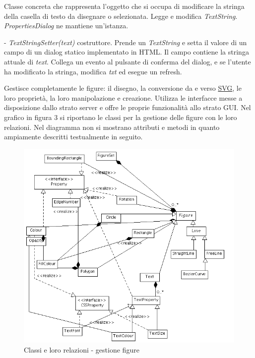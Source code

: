 Classe concreta che rappresenta l'oggetto che si occupa di modificare la stringa della casella di testo da disegnare o selezionata.
Legge e modifica \textit{TextString}.
\textit{PropertiesDialog} ne mantiene un'istanza.
\begin{elencopuntato}[\subsubsecindent]
\item[-] \textit{TextStringSetter(text)} costruttore. Prende un \textit{TextString} e setta il valore di un campo di un dialog statico implementato in HTML. Il campo contiene la stringa attuale di \textit{text}. Collega un evento al pulsante di conferma del dialog, e se l'utente ha modificato la stringa, modifica \textit{txt} ed esegue un refresh.
\end{elencopuntato}


Gestisce completamente le figure: il disegno, la conversione da e verso \underline{SVG}, le loro propriet\`a, la loro manipolazione e creazione. Utilizza le interfacce messe a disposizione dallo strato server e offre le proprie funzionalit\`a allo strato GUI. Nel grafico in figura 3 si riportano le classi per la gestione delle figure con le loro relazioni. Nel diagramma non si mostrano attributi e metodi in quanto ampiamente descritti testualmente in seguito.

\begin{figure}[!ht]
\centering
\includegraphics[scale=0.5]{applogic_figures.png}
\caption{Classi e loro relazioni - gestione figure}
\end{figure}

